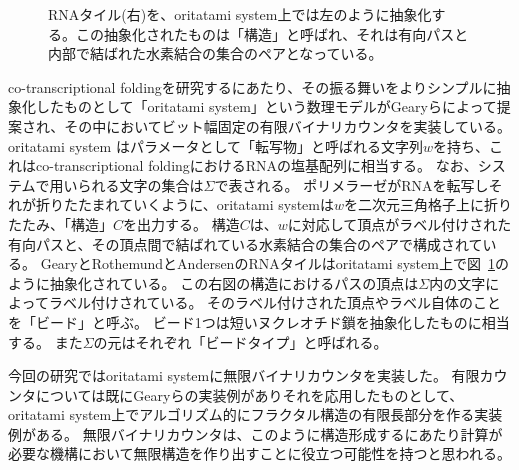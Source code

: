 \documentclass[a4,11pt]{article}
\begin{document}
\begin{figure}[tb]
    	\centering
	\caption{RNAタイル(右)を、oritatami system上では左のように抽象化する。この抽象化されたものは「構造」と呼ばれ、それは有向パスと内部で結ばれた水素結合の集合のペアとなっている。}
	\label{fig:tileabstract}
\end{figure}

co-transcriptional foldingを研究するにあたり、その振る舞いをよりシンプルに抽象化したものとして「oritatami system」という数理モデルがGearyらによって提案され\cite{GeMeScSe2019}、その中においてビット幅固定の有限バイナリカウンタを実装している。
oritatami system はパラメータとして「転写物」と呼ばれる文字列$w$を持ち、これはco-transcriptional foldingにおけるRNAの塩基配列に相当する。
なお、システムで用いられる文字の集合は$\Sigma$で表される。
ポリメラーゼがRNAを転写しそれが折りたたまれていくように、oritatami systemは$w$を二次元三角格子上に折りたたみ、「構造」$C$を出力する。
構造$C$は、$w$に対応して頂点がラベル付けされた有向パスと、その頂点間で結ばれている水素結合の集合のペアで構成されている。
GearyとRothemundとAndersenのRNAタイルはoritatami system上で図~\ref{fig:tileabstract}のように抽象化されている。
この右図の構造におけるパスの頂点は$\Sigma$内の文字によってラベル付けされている。
そのラベル付けされた頂点やラベル自体のことを「ビード」と呼ぶ。
ビード1つは短いヌクレオチド鎖を抽象化したものに相当する。
また$\Sigma$の元はそれぞれ「ビードタイプ」と呼ばれる。

今回の研究ではoritatami systemに無限バイナリカウンタを実装した。
有限カウンタについては既にGearyらの実装例があり\cite{GeMeScSe2019}それを応用したものとして、oritatami system上でアルゴリズム的にフラクタル構造の有限長部分を作る実装例がある\cite{heighway}。
無限バイナリカウンタは、このように構造形成するにあたり計算が必要な機構において無限構造を作り出すことに役立つ可能性を持つと思われる。
\end{document}
